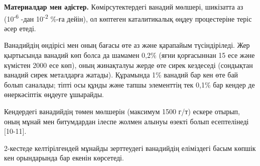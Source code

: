 









\begin{multicols}{2}

{\bfseries Материалдар мен әдістер.} Көмірсутектердегі ванадий мөлшері, шикізатта аз
(10\textsuperscript{-6} -дан 10\textsuperscript{-2} \%-ға дейін), ол
көптеген каталитикалық өңдеу процестеріне теріс әсер етеді.

Ванадийдің өндірісі мен оның бағасы өте аз және қарапайым түсіндіріледі.
Жер қыртысында ванадий көп болса да шамамен 0,2\% (яғни қорғасыннан 15
есе және күмістен 2000 есе көп), оның жинақталуы жерде өте сирек
кездеседі (сондықтан ванадий сирек металдарға жатады). Құрамында 1\%
ванадий бар кен өте бай болып саналады; тіпті осы құнды және тапшы
элементтің тек 0,1\% бар кендер де өнеркәсіптік өңдеуге ұшырайды.

Кендердегі ванадийдің төмен мөлшерін (максимум 1500 г/т) ескере отырып,
оның мұнай мен битумдардан ілеспе жолмен алынуы өзекті болып
есептелінеді {[}10-11{]}.

2-кестеде келтірілгендей мұнайды зерттеудегі ванадийдің еліміздегі басым
көпшік кен орындарында бар екенін көрсетеді.
\end{multicols}

